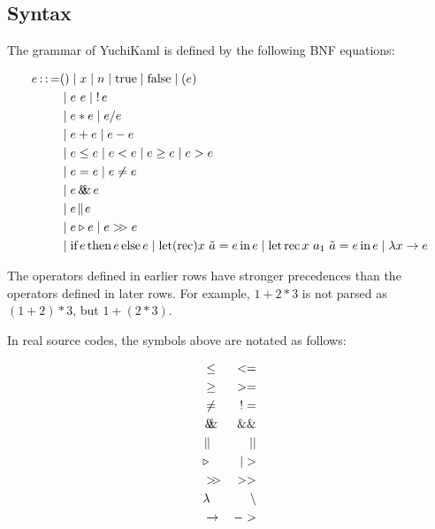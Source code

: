 \subsection{Syntax}

The grammar of YuchiKaml is defined by the following BNF equations:

\begin{align*}
    e \defeq    & () \mid x \mid n \mid \trueToken \mid \falseToken \mid (e)\\
                &\mid e\ e \mid \logNot e\\
                &\mid e * e \mid e / e\\
                &\mid e + e \mid e - e\\
                &\mid e \leq e \mid e < e \mid e \geq e \mid e > e\\
                &\mid e = e \mid e \not= e\\
                &\mid e \logAnd e\\
                &\mid e \logOr e\\
                &\mid e \triangleright e \mid e \composition e\\
                &\mid \ifToken e \thenToken e \elseToken e \mid \letToken (\recToken) x\ \tilde{a} = e \inToken e \mid \letToken \recToken x\ a_1\ \tilde{a} = e \inToken e\mid \lambda x \rightarrow e
\end{align*}

The operators defined in earlier rows have stronger precedences than the operators defined in later rows.
For example, $1 + 2 * 3$ is not parsed as $(1 + 2) * 3$, but $1 + ( 2 * 3)$.

In real source codes, the symbols above are notated as follows:

\begin{align*}
    &\leq & <=\\
    &\geq & >=\\
    &\not= & !=\\
    &\logAnd & \&\&\\
    &\logOr & ||\\
    &\triangleright & |>\\
    &\composition & >>\\
    &\lambda & \backslash\\
    &\rightarrow & ->
\end{align*}
